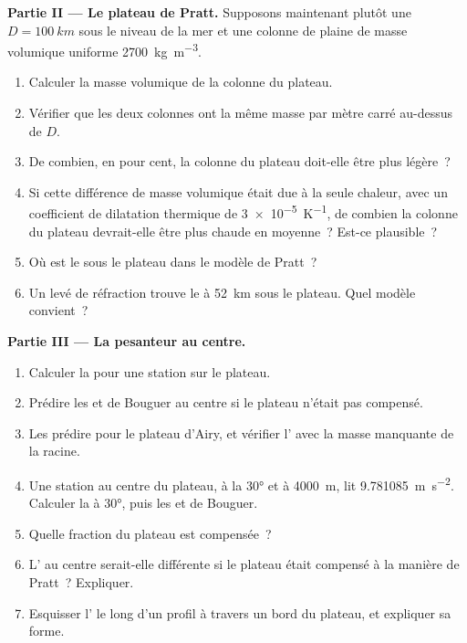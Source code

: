\begin{problem}
\noindent\textbf{Partie II --- Le plateau de Pratt.}
Supposons maintenant plutôt une  $D = \qty{100}{km}$ sous le niveau de la mer et
une colonne de plaine de masse volumique uniforme \qty{2700}{kg.m^{-3}}.
\begin{enumerate}[resume]
  \item Calculer la masse volumique de la colonne du plateau.
  \item Vérifier que les deux colonnes ont la même masse par mètre carré au-dessus de
        $D$.
  \item De combien, en pour cent, la colonne du plateau doit-elle être plus légère~?
  \item Si cette différence de masse volumique était due à la seule chaleur, avec un
        coefficient de dilatation thermique de \qty{3e-5}{K^{-1}}, de combien la colonne du
        plateau devrait-elle être plus chaude en moyenne~? Est-ce plausible~?
  \item Où est le  sous le plateau dans le modèle de Pratt~?
  \item Un levé de réfraction trouve le  à \qty{52}{km} sous le plateau.
        Quel modèle convient~?
\end{enumerate}

\noindent\textbf{Partie III --- La pesanteur au centre.}
\begin{enumerate}[resume]
  \item Calculer la  pour une station sur le plateau.
  \item Prédire les  et de Bouguer au centre si le plateau
        n'était pas compensé.
  \item Les prédire pour le plateau d'Airy, et vérifier l' avec
        la masse manquante de la racine.
  \item Une station au centre du plateau, à la  \ang{30} et à
        \qty{4000}{m}, lit \qty{9.781085}{m.s^{-2}}. Calculer la 
        à \ang{30}, puis les  et de Bouguer.
  \item Quelle fraction du plateau est compensée~?
  \item L' au centre serait-elle différente si le plateau
        était compensé à la manière de Pratt~? Expliquer.
  \item Esquisser l' le long d'un profil à travers un bord du
        plateau, et expliquer sa forme.
\end{enumerate}


\end{problem}
